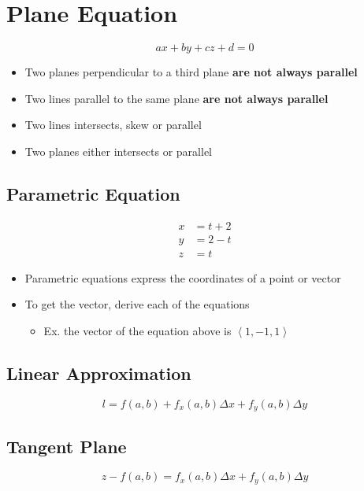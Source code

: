 \section{Plane Equation}

  \begin{equation}
    ax + by + cz + d = 0
  \end{equation}

  \begin{itemize}
    \item Two planes perpendicular to a third plane \textbf{are not always parallel}
    \item Two lines parallel to the same plane \textbf{are not always parallel}
    \item Two lines intersects, skew or parallel
    \item Two planes either intersects or parallel
  \end{itemize}

  \subsection{Parametric Equation}

    \begin{align*}
      x &= t + 2 \\
      y &= 2 - t \\
      z &= t
    \end{align*}

    \begin{itemize}
      \item Parametric equations express the coordinates of a point or vector
      \item To get the vector, derive each of the equations
      \begin{itemize}
        \item Ex. the vector of the equation above is $ \left< 1, -1, 1 \right> $
      \end{itemize}
    \end{itemize}


  \subsection{Linear Approximation}

    \begin{equation}
      l = f\left( a, b \right)
        + f_{x} \left( a, b \right) \Delta x
        + f_{y} \left( a, b \right) \Delta y
    \end{equation}

  \subsection{Tangent Plane}

    \begin{equation}
      z - f\left( a, b \right)
        = f_{x} \left( a, b \right) \Delta x
        + f_{y} \left( a, b \right) \Delta y
    \end{equation}